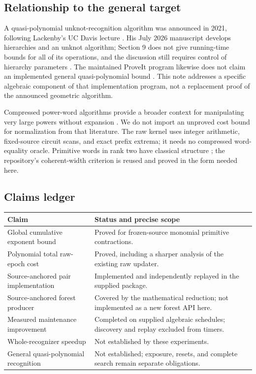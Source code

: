 \documentclass[11pt,letterpaper]{article}
\theoremstyle{definition}
\theoremstyle{remark}\newtheorem{remark}[theorem]{Remark}
\begin{document}
\subsection{Relationship to the general target}

A quasi-polynomial unknot-recognition algorithm was announced in 2021,
following Lackenby's UC Davis lecture \cite{lackenby-talk}. His July 2026 manuscript develops
hierarchies and an unknot algorithm; Section 9 does not give running-time
bounds for all of its operations, and the discussion still requires control
of hierarchy parameters \cite{lackenby-2026}. The maintained ProveIt program
likewise does not claim an implemented general quasi-polynomial bound
\cite{repo-root}. This note addresses a specific algebraic component of that
implementation program, not a replacement proof of the announced geometric
algorithm.

Compressed power-word algorithms provide a broader context for manipulating
very large powers without expansion \cite{lohrey-weiss}. We do not import an
unproved cost bound for normalization from that literature. The raw kernel
uses integer arithmetic, fixed-source circuit scans, and exact prefix extrema;
it needs no compressed word-equality oracle. Primitive words in rank two have
classical structure \cite{osborne-zieschang}; the repository's coherent-width
criterion is reused and proved in the form needed here.

\subsection{Claims ledger}

\begin{center}\small
\begin{tabular}{p{}p{}}
\toprule
Claim & Status and precise scope\\
\midrule
Global cumulative exponent bound & Proved for frozen-source monomial primitive contractions.\\
Polynomial total raw-epoch cost & Proved, including a sharper analysis of the existing raw updater.\\
Source-anchored pair implementation & Implemented and independently replayed in the supplied package.\\
Source-anchored forest producer & Covered by the mathematical reduction; not implemented as a new forest API here.\\
Measured maintenance improvement & Completed on supplied algebraic schedules; discovery and replay excluded from timers.\\
Whole-recognizer speedup & Not established by these experiments.\\
General quasi-polynomial recognition & Not established; exposure, resets, and complete search remain separate obligations.\\
\bottomrule
\end{tabular}
\end{center}
\end{document}

